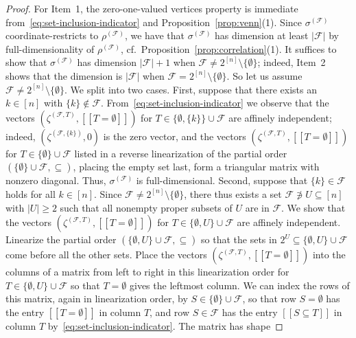 \documentclass[11pt]{article}
\newcommand{\iv}[1]{\ensuremath{[\![{#1}]\!]}}
\newcommand{\up}{\ensuremath{\sigma}}
\newcommand{\cp}{\ensuremath{\rho}}
\begin{document}
\upgeom*

\begin{proof}
For Item~1, the zero-one-valued vertices property is
immediate from~\eqref{eq:set-inclusion-indicator}
and Proposition~\ref{prop:venn}(1).
Since $\up^{(\mathcal{F})}$ coordinate-restricts to 
$\cp^{(\mathcal{F})}$, we have that $\up^{(\mathcal{F})}$ has 
dimension at least $|\mathcal{F}|$ by full-dimensionality of 
$\cp^{(\mathcal{F})}$, cf.~Proposition~\ref{prop:correlation}(1). 
It suffices to show that $\up^{(\mathcal{F})}$ has 
dimension $|\mathcal{F}|+1$ when 
$\mathcal{F}\neq 2^{[n]}\setminus\{\emptyset\}$; indeed, 
Item~2 shows that the dimension is $|\mathcal{F}|$ when 
$\mathcal{F}=2^{[n]}\setminus\{\emptyset\}$. So let us assume
$\mathcal{F}\neq 2^{[n]}\setminus\{\emptyset\}$. We split into two cases.
First, suppose that there exists an $k\in [n]$ with $\{k\}\notin\mathcal{F}$.
From~\eqref{eq:set-inclusion-indicator} we observe that the vectors
$(\zeta^{(\mathcal{F},T)},\iv{T=\emptyset})$ for 
$T\in\{\emptyset,\{k\}\}\cup\mathcal{F}$ are affinely
independent; indeed, $(\zeta^{(\mathcal{F},\{k\})},0)$ is the zero vector,
and the vectors $(\zeta^{(\mathcal{F},T)},\iv{T=\emptyset})$ 
for $T\in\{\emptyset\}\cup\mathcal{F}$ listed in a reverse linearization 
of the partial order $(\{\emptyset\}\cup\mathcal{F},\subseteq)$, placing
the empty set last, form a triangular matrix with nonzero diagonal. Thus, 
$\up^{(\mathcal{F})}$ is full-dimensional.
Second, suppose that $\{k\}\in\mathcal{F}$ holds for all $k\in[n]$.
Since $\mathcal{F}\neq 2^{[n]}\setminus\{\emptyset\}$, there thus exists 
a set $\mathcal{F}\not\ni U\subseteq [n]$ with $|U|\geq 2$ such that all 
nonempty proper subsets of $U$ are in $\mathcal{F}$.
We show that the vectors $(\zeta^{(\mathcal{F},T)},\iv{T=\emptyset})$ for 
$T\in\{\emptyset,U\}\cup\mathcal{F}$ are affinely independent.
Linearize the partial order 
$(\{\emptyset,U\}\cup\mathcal{F},\subseteq)$ so that the sets
in $2^U\subseteq \{\emptyset,U\}\cup\mathcal{F}$ come before all 
the other sets. Place the vectors 
$(\zeta^{(\mathcal{F},T)},\iv{T=\emptyset})$ into the columns of a 
matrix from left to right in this linearization order 
for $T\in\{\emptyset,U\}\cup\mathcal{F}$ so that $T=\emptyset$ gives 
the leftmost column. We can index the rows of this matrix, again in 
linearization order, by $S\in\{\emptyset\}\cup\mathcal{F}$, so that 
row $S=\emptyset$ has
the entry $\iv{T=\emptyset}$ in column $T$, and row $S\in\mathcal{F}$
has the entry $\iv{S\subseteq T}$ in column $T$ 
by~\eqref{eq:set-inclusion-indicator}. The matrix has shape 

\end{proof}
\end{document}
